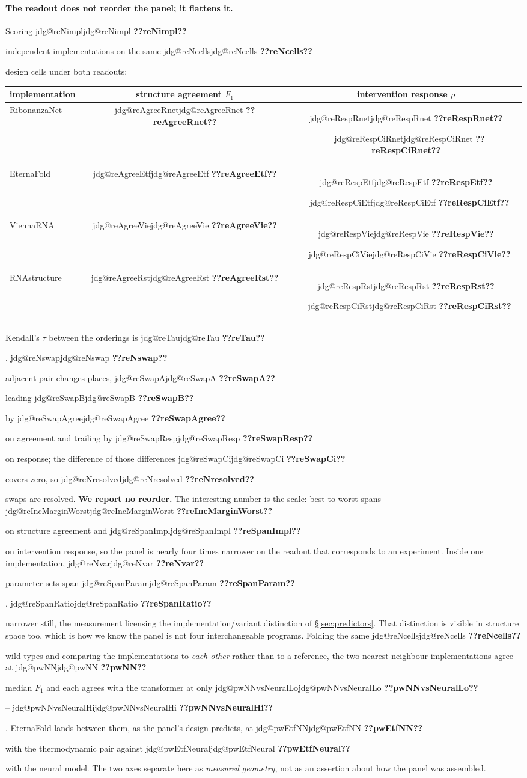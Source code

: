 \documentclass[11pt]{article}
\makeatletter
\newcommand{\jdg}[1]{%
  \ifcsname jdg@#1\endcsname\csname jdg@#1\endcsname
  \else\textbf{??#1??}\PackageError{nm}{undefined measured quantity #1}{}\fi}
\makeatother
\begin{document}
\paragraph{The readout does not reorder the panel; it flattens it.} Scoring
\jdg{reNimpl} independent implementations on the same \jdg{reNcells} design cells under both
readouts:

\begin{center}\small
\begin{tabular}{@{}lcc@{}}
\toprule
implementation & structure agreement $F_1$ & intervention response $\rho$ \\
\midrule
RibonanzaNet & \jdg{reAgreeRnet} & \jdg{reRespRnet}~\jdg{reRespCiRnet} \\
EternaFold   & \jdg{reAgreeEtf}  & \jdg{reRespEtf}~\jdg{reRespCiEtf} \\
ViennaRNA    & \jdg{reAgreeVie}  & \jdg{reRespVie}~\jdg{reRespCiVie} \\
RNAstructure & \jdg{reAgreeRst}  & \jdg{reRespRst}~\jdg{reRespCiRst} \\
\bottomrule
\end{tabular}
\end{center}

\noindent Kendall's $\tau$ between the orderings is \jdg{reTau}. \jdg{reNswap} adjacent pair changes places,
\jdg{reSwapA} leading \jdg{reSwapB} by \jdg{reSwapAgree} on agreement and trailing by
\jdg{reSwapResp} on response; the difference of those differences \jdg{reSwapCi} covers zero, so
\jdg{reNresolved} swaps are resolved. \textbf{We report no reorder.} The interesting number is the scale: best-to-worst spans \jdg{reIncMarginWorst} on structure
agreement and \jdg{reSpanImpl} on intervention response, so the panel is nearly four times narrower
on the readout that corresponds to an experiment. Inside one implementation, \jdg{reNvar} parameter
sets span \jdg{reSpanParam}, \jdg{reSpanRatio} narrower still, the measurement licensing the
implementation/variant distinction of \S\ref{sec:predictors}. That distinction is visible in
structure space too, which is how we know the panel is not four interchangeable programs. Folding the same \jdg{reNcells} wild types and comparing the implementations to \emph{each other}
rather than to a reference, the two nearest-neighbour implementations agree at \jdg{pwNN} median
$F_1$ and each agrees with the transformer at only \jdg{pwNNvsNeuralLo}--\jdg{pwNNvsNeuralHi}.
EternaFold lands between them, as the panel's design predicts, at \jdg{pwEtfNN} with the
thermodynamic pair against \jdg{pwEtfNeural} with the neural model. The two axes separate here as
\emph{measured geometry}, not as an assertion about how the panel was assembled.
\end{document}
